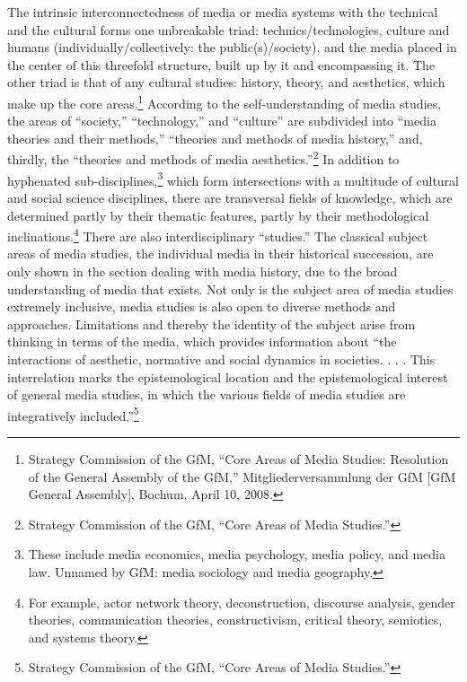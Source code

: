 \documentclass{tufte-handout}
\begin{document}
The intrinsic interconnectedness of media or media systems with the
technical and the cultural forms one unbreakable triad:
technics/technologies, culture and humans (individually/collectively:
the public(s)/society), and the media placed in the center of this
threefold structure, built up by it and encompassing it. The other triad
is that of any cultural studies: history, theory, and aesthetics, which
make up the core areas.\footnote{Strategy Commission of the GfM, ``Core
  Areas of Media Studies: Resolution of the General Assembly of the
  GfM,'' Mitgliederversammlung der GfM {[}GfM General Assembly{]},
  Bochum, April 10, 2008.} According to the self-understanding of media
studies, the areas of ``society,'' ``technology,'' and ``culture'' are
subdivided into ``media theories and their methods,'' ``theories and
methods of media history,'' and, thirdly, the ``theories and methods of
media aesthetics.''\footnote{Strategy Commission of the GfM, ``Core
  Areas of Media Studies.''} In addition to hyphenated
sub-disciplines,\footnote{These include media economics, media
  psychology, media policy, and media law. Unnamed by GfM: media
  sociology and media geography.} which form intersections with a
multitude of cultural and social science disciplines, there are
transversal fields of knowledge, which are determined partly by their
thematic features, partly by their methodological
inclinations.\footnote{For example, actor network theory,
  deconstruction, discourse analysis, gender theories, communication
  theories, constructivism, critical theory, semiotics, and systems
  theory.} There are also interdisciplinary ``studies.'' The classical
subject areas of media studies, the individual media in their historical
succession, are only shown in the section dealing with media history,
due to the broad understanding of media that exists. Not only is the
subject area of media studies extremely inclusive, media studies is also
open to diverse methods and approaches. Limitations and thereby the
identity of the subject arise from thinking in terms of the media, which
provides information about ``the interactions of aesthetic, normative
and social dynamics in societies. . . . This interrelation marks the
epistemological location and the epistemological interest of general
media studies, in which the various fields of media studies are
integratively included.''\footnote{Strategy Commission of the GfM,
  ``Core Areas of Media Studies.''}
\end{document}

